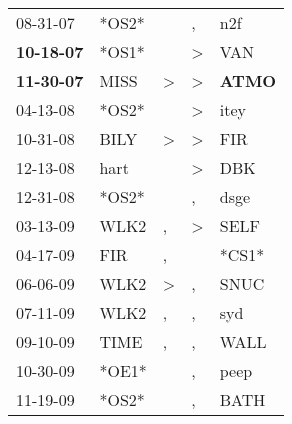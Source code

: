 \begin{supertabular}{p{0.07\textwidth}p{0.06\textwidth}p{0.02\textwidth}p{0.02\textwidth}p{0.06\textwidth}}
          08-31-07\textsuperscript{} &                            *OS2* &                  &                , &            n2f\textsuperscript{} \\
 \textbf{10-18-07\textsuperscript{}} &                            *OS1* &                  &     \textgreater &            VAN\textsuperscript{} \\
 \textbf{11-30-07\textsuperscript{}} &           MISS\textsuperscript{} &     \textgreater &     \textgreater &  \textbf{ATMO\textsuperscript{}} \\
          04-13-08\textsuperscript{} &                            *OS2* &                  &     \textgreater &           itey\textsuperscript{} \\
          10-31-08\textsuperscript{} &           BILY\textsuperscript{} &     \textgreater &     \textgreater &            FIR\textsuperscript{} \\
          12-13-08\textsuperscript{} &           hart\textsuperscript{} &                  &     \textgreater &            DBK\textsuperscript{} \\
          12-31-08\textsuperscript{} &                            *OS2* &                  &                , &           dsge\textsuperscript{} \\
          03-13-09\textsuperscript{} &           WLK2\textsuperscript{} &                , &     \textgreater &           SELF\textsuperscript{} \\
          04-17-09\textsuperscript{} &            FIR\textsuperscript{} &                , &                  &                            *CS1* \\
          06-06-09\textsuperscript{} &           WLK2\textsuperscript{} &     \textgreater &                , &           SNUC\textsuperscript{} \\
          07-11-09\textsuperscript{} &           WLK2\textsuperscript{} &                , &                , &            syd\textsuperscript{} \\
          09-10-09\textsuperscript{} &           TIME\textsuperscript{} &                , &                , &           WALL\textsuperscript{} \\
          10-30-09\textsuperscript{} &                            *OE1* &                  &                , &           peep\textsuperscript{} \\
          11-19-09\textsuperscript{} &                            *OS2* &                  &                , &           BATH\textsuperscript{} \\

\end{supertabular}

